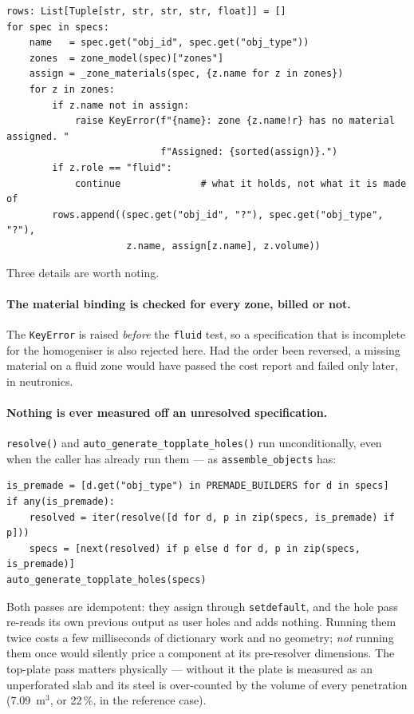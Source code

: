 \documentclass[9pt,a4paper]{extarticle}
\newcommand{\code}[1]{\texttt{\small #1}}
\begin{document}
\begin{lstlisting}[style=py]
rows: List[Tuple[str, str, str, str, float]] = []
for spec in specs:
    name   = spec.get("obj_id", spec.get("obj_type"))
    zones  = zone_model(spec)["zones"]
    assign = _zone_materials(spec, {z.name for z in zones})
    for z in zones:
        if z.name not in assign:
            raise KeyError(f"{name}: zone {z.name!r} has no material assigned. "
                           f"Assigned: {sorted(assign)}.")
        if z.role == "fluid":
            continue              # what it holds, not what it is made of
        rows.append((spec.get("obj_id", "?"), spec.get("obj_type", "?"),
                     z.name, assign[z.name], z.volume))
\end{lstlisting}

Three details are worth noting.

\paragraph{The material binding is checked for every zone, billed or not.}
The \code{KeyError} is raised \emph{before} the \code{fluid} test, so a
specification that is incomplete for the homogeniser is also rejected here. Had
the order been reversed, a missing material on a fluid zone would have passed the
cost report and failed only later, in neutronics.

\paragraph{Nothing is ever measured off an unresolved specification.}
\code{resolve()} and \code{auto\_generate\_topplate\_holes()} run
unconditionally, even when the caller has already run them --- as
\code{assemble\_objects} has:

\begin{lstlisting}[style=py]
is_premade = [d.get("obj_type") in PREMADE_BUILDERS for d in specs]
if any(is_premade):
    resolved = iter(resolve([d for d, p in zip(specs, is_premade) if p]))
    specs = [next(resolved) if p else d for d, p in zip(specs, is_premade)]
auto_generate_topplate_holes(specs)
\end{lstlisting}

Both passes are idempotent: they assign through \code{setdefault}, and the hole
pass re-reads its own previous output as user holes and adds nothing. Running
them twice costs a few milliseconds of dictionary work and no geometry;
\emph{not} running them once would silently price a component at its
pre-resolver dimensions. The top-plate pass matters physically --- without it
the plate is measured as an unperforated slab and its steel is over-counted by
the volume of every penetration (7.09~m$^3$, or 22\,\%, in the reference case).
\end{document}
